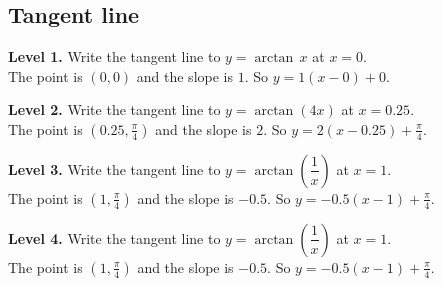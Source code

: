 \documentclass[11pt]{article}
\begin{document}
\subsection*{Tangent line}
\noindent\textbf{Level 1.} Write the tangent line to $y=\arctan\,x$ at $x=0$.\\  \quad The point is $(0,0)$ and the slope is $1$. So $y=1(x-0)+0$.\par\medskip
\noindent\textbf{Level 2.} Write the tangent line to $y=\arctan\left(4x\right)$ at $x=0.25$.\\  \quad The point is $(0.25,\tfrac{\pi}{4})$ and the slope is $2$. So $y=2(x-0.25)+\tfrac{\pi}{4}$.\par\medskip
\noindent\textbf{Level 3.} Write the tangent line to $y=\arctan\left(\dfrac1x\right)$ at $x=1$.\\  \quad The point is $(1,\tfrac{\pi}{4})$ and the slope is $-0.5$. So $y=-0.5(x-1)+\tfrac{\pi}{4}$.\par\medskip
\noindent\textbf{Level 4.} Write the tangent line to $y=\arctan\left(\dfrac1x\right)$ at $x=1$.\\  \quad The point is $(1,\tfrac{\pi}{4})$ and the slope is $-0.5$. So $y=-0.5(x-1)+\tfrac{\pi}{4}$.\par\medskip
\end{document}
